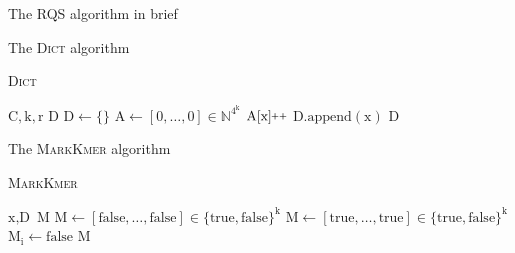 \documentclass[12pt]{beamer}
\newcommand{\pp}{\nolinebreak\hspace{-.05em}\raisebox{.4ex}{\tiny\bf +}\nolinebreak\raisebox{.4ex}{\tiny\bf +}\xspace}
\begin{document}
    \begin{frame}{The RQS algorithm in brief}
    \end{frame}

    \begin{frame}{The \textsc{Dict} algorithm}
        \begin{algorithm}[H]
            \caption{\textsc{Dict}}
            \begin{algorithmic}[1]
                \REQUIRE \(\text{C}, \text{k}, \text{r}\)
                \ENSURE \(\text{D}\)
                \STATE \(\text{D} \leftarrow \{\}\)
                \STATE \(\text{A} \leftarrow [0,\dots,0] \in \mathbb{N}^{4^\text{k}}\)
                    \STATE \(\text{A}[\text{x}]\pp\)
                \ENDFOR
                        \STATE \(\text{D}.\text{append}(\text{x})\)
                    \ENDIF
                \ENDFOR
                \RETURN \(\text{D}\)
            \end{algorithmic}
        \end{algorithm}
    \end{frame}

    \begin{frame}{The \textsc{MarkKmer} algorithm}
        \begin{algorithm}[H]
            \caption{\textsc{MarkKmer}}
            \begin{algorithmic}[1]
                \REQUIRE \(\text{x}, \text{D}\)
                \ENSURE \(\text{M}\)
                    \STATE \(\text{M} \leftarrow [\text{false},\dots,\text{false}]\in\{\text{true},\text{false}\}^\text{k}\)
                \ELSE
                    \STATE \(\text{M} \leftarrow [\text{true},\dots,\text{true}]\in\{\text{true},\text{false}\}^\text{k}\)
                                \STATE \(\text{M}_\text{i}\leftarrow\text{false}\)
                            \ENDIF
                        \ENDFOR
                    \ENDFOR
                \ENDIF
                \RETURN \(\text{M}\)
            \end{algorithmic}
        \end{algorithm}
    \end{frame}
\end{document}
